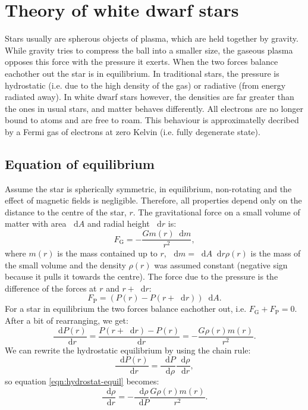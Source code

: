 \documentclass[]{article}
\newcommand{\dd}{\mathop{}\!\mathrm{d}}
\begin{document}
\section{Theory of white dwarf stars}\label{sec:theroy-white-dwarfs}
	Stars usually are spherous objects of plasma, which are held together by gravity. While gravity tries to compress the ball into a smaller size, the gaseous plasma opposes this force with the pressure it exerts. When the two forces balance eachother out the star is in equilibrium. In traditional stars, the pressure is hydrostatic (i.e. due to the high density of the gas) or radiative (from energy radiated away). In white dwarf stars however, the densities are far greater than the ones in usual stars, and matter behaves differently. All electrons are no longer bound to atoms and are free to roam. This behaviour is approximatelly decribed by a Fermi gas of electrons at zero Kelvin (i.e. fully degenerate state).

\subsection{Equation of equilibrium}\label{subsec:test}
	Assume the star is spherically symmetric, in equilibrium, non-rotating and the effect of magnetic fields is negligible. Therefore, all properties depend only on the distance to the centre of the star, $r$. The gravitational force on a small volume of matter with area $\dd A$ and radial height $\dd r$ is:
	\begin{equation}
		F_\mathrm{G} = - \frac{G m\left(r\right) \dd m}{r^2},
	\end{equation}
	where $m\left(r\right)$ is the mass contained up to $r$, $\dd m = \dd A \dd r \rho \left(r\right)$ is the mass of the small volume and the density $\rho \left(r\right)$ was assumed constant (negative sign because it pulls it towards the centre). The force due to the pressure is the difference of the forces at $r$ and $r + \dd r$:
	\begin{equation}
	F_\mathrm{P} = \left( P\left(r\right) - P\left(r + \dd r\right)\right) \dd A.
	\end{equation}
	For a star in equilibrium the two forces balance eachother out, i.e. $F_\mathrm{G} + F_\mathrm{P} = 0$. After a bit of rearranging, we get:
	\begin{equation} \label{eqn:hydrostat-equil}
		\frac{\dd P(r)}{\dd r} = \frac{P\left(r + \dd r\right) - P\left(r\right)}{\dd r} = - \frac{G \rho(r) m(r)}{r^2}.
	\end{equation}
	We can rewrite the hydrostatic equilibrium by using the chain rule:
	\begin{equation}
		\frac{\dd P(r)}{\dd r} = \frac{\dd P}{\dd \rho} \frac{\dd \rho}{\dd r},
	\end{equation}
	so equation \eqref{eqn:hydrostat-equil} becomes:
	\begin{equation}\label{eqn:hydrostat-equil-rhor}
		\frac{\dd \rho}{\dd r} = - \frac{\dd \rho}{\dd P} \frac{G \rho(r) m(r)}{r^2}.
	\end{equation}
\end{document}

